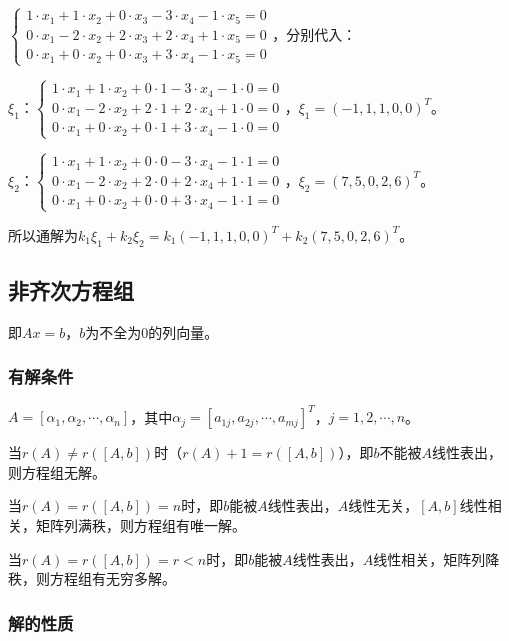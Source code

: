 $\left\{\begin{array}{l}
    1\cdot x_1+1\cdot x_2+0\cdot x_3-3\cdot x_4-1\cdot x_5=0 \\
    0\cdot x_1-2\cdot x_2+2\cdot x_3+2\cdot x_4+1\cdot x_5=0 \\
    0\cdot x_1+0\cdot x_2+0\cdot x_3+3\cdot x_4-1\cdot x_5=0
\end{array}\right.$，分别代入：

$\xi_1$：$\left\{\begin{array}{l}
    1\cdot x_1+1\cdot x_2+0\cdot1-3\cdot x_4-1\cdot0=0 \\
    0\cdot x_1-2\cdot x_2+2\cdot1+2\cdot x_4+1\cdot0=0 \\
    0\cdot x_1+0\cdot x_2+0\cdot1+3\cdot x_4-1\cdot0=0
\end{array}\right.$，$\xi_1=(-1,1,1,0,0)^T$。

$\xi_2$：$\left\{\begin{array}{l}
    1\cdot x_1+1\cdot x_2+0\cdot0-3\cdot x_4-1\cdot1=0 \\
    0\cdot x_1-2\cdot x_2+2\cdot0+2\cdot x_4+1\cdot1=0 \\
    0\cdot x_1+0\cdot x_2+0\cdot0+3\cdot x_4-1\cdot1=0
\end{array}\right.$，$\xi_2=(7,5,0,2,6)^T$。\medskip

所以通解为$k_1\xi_1+k_2\xi_2=k_1(-1,1,1,0,0)^T+k_2(7,5,0,2,6)^T$。

\subsection{非齐次方程组}

即$Ax=b$，$b$为不全为0的列向量。

\subsubsection{有解条件}

$A=[\alpha_1,\alpha_2,\cdots,\alpha_n]$，其中$\alpha_j=[a_{1j},a_{2j},\cdots,a_{mj}]^T$，$j=1,2,\cdots,n$。

当$r(A)\neq r([A,b])$时（$r(A)+1=r([A,b])$），即$b$不能被$A$线性表出，则方程组无解。

当$r(A)=r([A,b])=n$时，即$b$能被$A$线性表出，$A$线性无关，$[A,b]$线性相关，矩阵列满秩，则方程组有唯一解。

当$r(A)=r([A,b])=r<n$时，即$b$能被$A$线性表出，$A$线性相关，矩阵列降秩，则方程组有无穷多解。

\subsubsection{解的性质}

